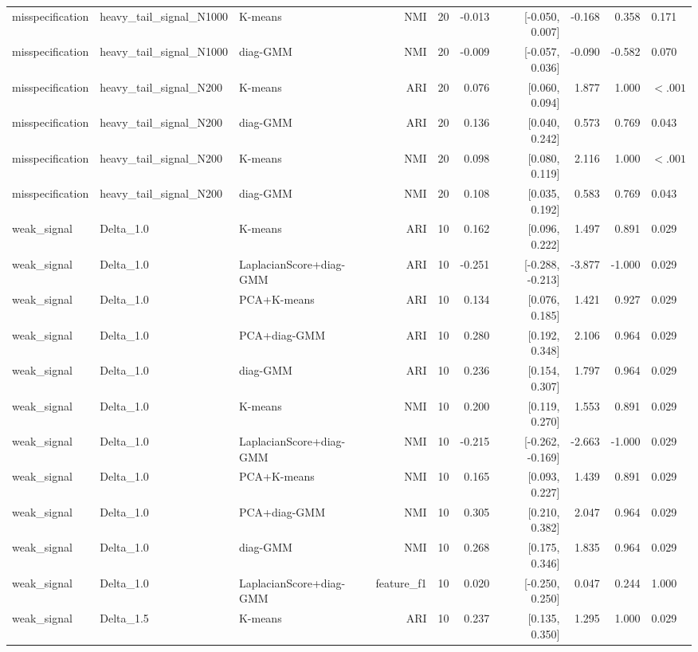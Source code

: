 \begin{table}[t]
\begin{tabular}{lllrrrrrr}
misspecification & heavy\_tail\_signal\_N1000 & K-means & NMI & 20 & -0.013 & [-0.050, 0.007] & -0.168 & 0.358 & 0.171 \\
misspecification & heavy\_tail\_signal\_N1000 & diag-GMM & NMI & 20 & -0.009 & [-0.057, 0.036] & -0.090 & -0.582 & 0.070 \\
misspecification & heavy\_tail\_signal\_N200 & K-means & ARI & 20 & 0.076 & [0.060, 0.094] & 1.877 & 1.000 & $<.001$ \\
misspecification & heavy\_tail\_signal\_N200 & diag-GMM & ARI & 20 & 0.136 & [0.040, 0.242] & 0.573 & 0.769 & 0.043 \\
misspecification & heavy\_tail\_signal\_N200 & K-means & NMI & 20 & 0.098 & [0.080, 0.119] & 2.116 & 1.000 & $<.001$ \\
misspecification & heavy\_tail\_signal\_N200 & diag-GMM & NMI & 20 & 0.108 & [0.035, 0.192] & 0.583 & 0.769 & 0.043 \\
weak\_signal & Delta\_1.0 & K-means & ARI & 10 & 0.162 & [0.096, 0.222] & 1.497 & 0.891 & 0.029 \\
weak\_signal & Delta\_1.0 & LaplacianScore+diag-GMM & ARI & 10 & -0.251 & [-0.288, -0.213] & -3.877 & -1.000 & 0.029 \\
weak\_signal & Delta\_1.0 & PCA+K-means & ARI & 10 & 0.134 & [0.076, 0.185] & 1.421 & 0.927 & 0.029 \\
weak\_signal & Delta\_1.0 & PCA+diag-GMM & ARI & 10 & 0.280 & [0.192, 0.348] & 2.106 & 0.964 & 0.029 \\
weak\_signal & Delta\_1.0 & diag-GMM & ARI & 10 & 0.236 & [0.154, 0.307] & 1.797 & 0.964 & 0.029 \\
weak\_signal & Delta\_1.0 & K-means & NMI & 10 & 0.200 & [0.119, 0.270] & 1.553 & 0.891 & 0.029 \\
weak\_signal & Delta\_1.0 & LaplacianScore+diag-GMM & NMI & 10 & -0.215 & [-0.262, -0.169] & -2.663 & -1.000 & 0.029 \\
weak\_signal & Delta\_1.0 & PCA+K-means & NMI & 10 & 0.165 & [0.093, 0.227] & 1.439 & 0.891 & 0.029 \\
weak\_signal & Delta\_1.0 & PCA+diag-GMM & NMI & 10 & 0.305 & [0.210, 0.382] & 2.047 & 0.964 & 0.029 \\
weak\_signal & Delta\_1.0 & diag-GMM & NMI & 10 & 0.268 & [0.175, 0.346] & 1.835 & 0.964 & 0.029 \\
weak\_signal & Delta\_1.0 & LaplacianScore+diag-GMM & feature\_f1 & 10 & 0.020 & [-0.250, 0.250] & 0.047 & 0.244 & 1.000 \\
weak\_signal & Delta\_1.5 & K-means & ARI & 10 & 0.237 & [0.135, 0.350] & 1.295 & 1.000 & 0.029 \\

\end{tabular}
\end{table}
